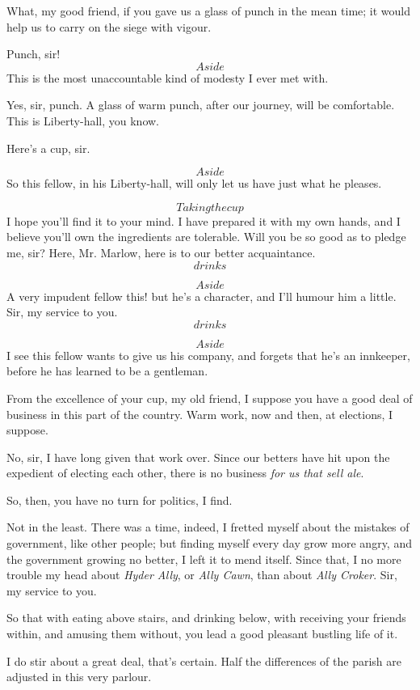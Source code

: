 \documentclass{book}
\begin{document}
\2  What, my good friend, if you gave us a glass of punch in the
mean time; it would help us to carry on the siege with vigour.

\3  Punch, sir!  \[Aside\]  This is the most unaccountable kind
of modesty I ever met with.

\2  Yes, sir, punch.  A glass of warm punch, after our journey,
will be comfortable.  This is Liberty-hall, you know.

\3  Here's a cup, sir.

\2  \[Aside\]  So this fellow, in his Liberty-hall, will only let
us have just what he pleases.

\3  \[Taking the cup\]  I hope you'll find it to your mind.  I
have prepared it with my own hands, and I believe you'll own the
ingredients are tolerable.  Will you be so good as to pledge me, sir? 
Here, Mr. Marlow, here is to our better acquaintance.  \[drinks\]

\2  \[Aside\]  A very impudent fellow this! but he's a character,
and I'll humour him a little.  Sir, my service to you.  \[drinks\]

\4  \[Aside\]  I see this fellow wants to give us his company,
and forgets that he's an innkeeper, before he has learned to be a
gentleman.

\2  From the excellence of your cup, my old friend, I suppose you
have a good deal of business in this part of the country.  Warm work,
now and then, at elections, I suppose.

\3  No, sir, I have long given that work over.  Since our
betters have hit upon the expedient of electing each other, there is no
business \textit{for us that sell ale}.

\4  So, then, you have no turn for politics, I find.

\3  Not in the least.  There was a time, indeed, I fretted
myself about the mistakes of government, like other people; but finding
myself every day grow more angry, and the government growing no better,
I left it to mend itself.  Since that, I no more trouble my head about
\textit{Hyder Ally}, or \textit{Ally Cawn}, than about \textit{Ally
Croker}.  Sir, my service to you.

\4  So that with eating above stairs, and drinking below, with
receiving your friends within, and amusing them without, you lead a
good pleasant bustling life of it.

\3  I do stir about a great deal, that's certain.  Half the
differences of the parish are adjusted in this very parlour.
\end{document}

